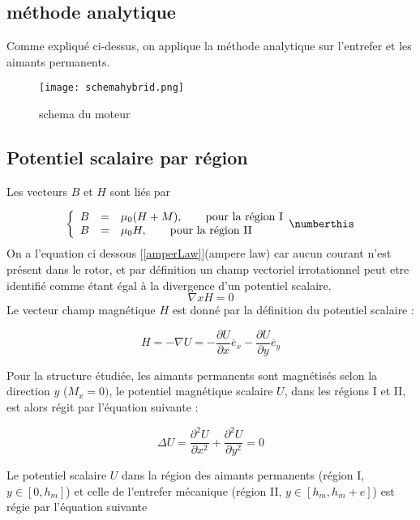 \subsection{méthode analytique}
Comme expliqué ci-dessus, on applique la méthode analytique sur l'entrefer et les aimants permanents.
\begin{figure}[H]
    \centering
    \texttt{[image: schemahybrid.png]}
    \caption{schema du moteur}
    \label{hyb}
\end{figure}


\subsection{Potentiel scalaire par région}
Les vecteurs $B$ et $H$ sont liés par

\[
\left\{
\begin{array}{r c l}
B &=& \mu_0(H+M), \qquad \text{pour la région I}\\
B &=& \mu_0H, \qquad \text{pour la région II}
\end{array}\numberthis
\right.
\]
On a l'equation ci dessous [\ref{amperLaw}](ampere law) car aucun courant n'est présent dans le rotor, et par définition un champ vectoriel irrotationnel peut etre identifié comme étant égal à la divergence d'un potentiel scalaire.
\begin{equation}
  \nabla xH=0
  \label{amperLaw}
\end{equation}
Le vecteur champ magnétique $H$ est donné par la définition du potentiel scalaire : 

\begin{equation}
    H = -\nabla U = -\frac{\partial U}{\partial x}\overline{e}_x -\frac{\partial U}{\partial y}\overline{e}_y
\end{equation}

Pour la structure étudiée, les aimants permanents sont magnétisés selon la direction $y$ ($M_x = 0)$, le potentiel magnétique scalaire $U$, dans les régions I et II, est alors régit par l'équation suivante : 

\begin{equation}
    \Delta U = \frac{\partial^2U}{\partial x^2}+\frac{\partial^2U}{\partial y^2} = 0
\end{equation}

Le potentiel scalaire $U$ dans la région des aimants permanents (région I, $y\in[0, h_m]$) et celle de l'entrefer mécanique (région II, $y\in[h_m, h_m+e]$) est régie par l'équation suivante

